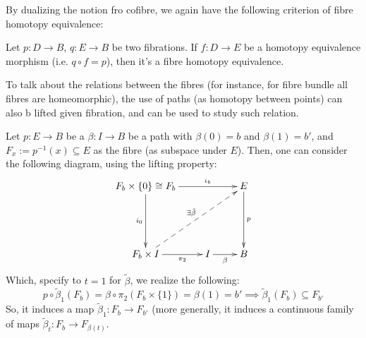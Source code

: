 \documentclass{article}
\begin{document}
By dualizing the notion fro cofibre, we again have the following criterion of fibre homotopy equivalence:
\begin{prop}
    Let $p:D\rightarrow B$, $q:E\rightarrow B$ be two fibrations. If $f:D\rightarrow E$ be a homotopy equivalence morphism (i.e. $q\circ f=p$), then it's a fibre homotopy equivalence.
\end{prop}

\hfil

To talk about the relations between the fibres (for instance, for fibre bundle all fibres are homeomorphic), the use of paths (as homotopy between points) can also b lifted given fibration, and can be used to study such relation.

Let $p:E\rightarrow B$ be a $\beta:I\rightarrow B$ be a path with $\beta(0)=b$ and $\beta(1)=b'$, and $F_x:=p^{-1}(x)\subseteq E$ as the fibre (as subspace under $E$). Then, one can consider the following diagram, using the lifting property:
\[\xymatrix{
    F_b\times \{0\}\cong F_b \ar[dd]_-{i_0} \ar[rr]^-{\iota_b} && E \ar[dd]^-{p}\\
    \\
    F_b\times I \ar@{-->}[uurr]^-{\exists \tilde{\beta}} \ar[r]_-{\pi_2} & I \ar[r]_-{\beta} & B
}\]
Which, specify to $t=1$ for $\tilde{\beta}$, we realize the following:
\[p\circ \tilde{\beta}_1 (F_b) = \beta\circ \pi_2 (F_b\times\{1\}) = \beta(1)=b'\implies \tilde{\beta}_1(F_b)\subseteq F_{b'}\]
So, it induces a map $\tilde{\beta}_1:F_b\rightarrow F_{b'}$ (more generally, it induces a continuous family of maps $\tilde{\beta}_t:F_b\rightarrow F_{\beta(t)}$.
\end{document}
